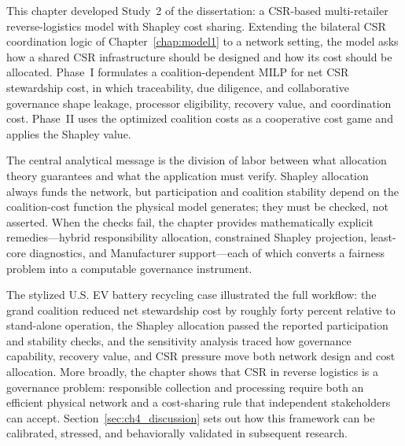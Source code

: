 This chapter developed Study~2 of the dissertation: a CSR-based multi-retailer reverse-logistics model with Shapley cost sharing. Extending the bilateral CSR coordination logic of Chapter~\ref{chap:model1} to a network setting, the model asks how a shared CSR infrastructure should be designed and how its cost should be allocated. Phase~I formulates a coalition-dependent MILP for net CSR stewardship cost, in which traceability, due diligence, and collaborative governance shape leakage, processor eligibility, recovery value, and coordination cost. Phase~II uses the optimized coalition costs as a cooperative cost game and applies the Shapley value.

The central analytical message is the division of labor between what allocation theory guarantees and what the application must verify. Shapley allocation always funds the network, but participation and coalition stability depend on the coalition-cost function the physical model generates; they must be checked, not asserted. When the checks fail, the chapter provides mathematically explicit remedies---hybrid responsibility allocation, constrained Shapley projection, least-core diagnostics, and Manufacturer support---each of which converts a fairness problem into a computable governance instrument.

The stylized U.S. EV battery recycling case illustrated the full workflow: the grand coalition reduced net stewardship cost by roughly forty percent relative to stand-alone operation, the Shapley allocation passed the reported participation and stability checks, and the sensitivity analysis traced how governance capability, recovery value, and CSR pressure move both network design and cost allocation. More broadly, the chapter shows that CSR in reverse logistics is a governance problem: responsible collection and processing require both an efficient physical network and a cost-sharing rule that independent stakeholders can accept. Section~\ref{sec:ch4_discussion} sets out how this framework can be calibrated, stressed, and behaviorally validated in subsequent research.
